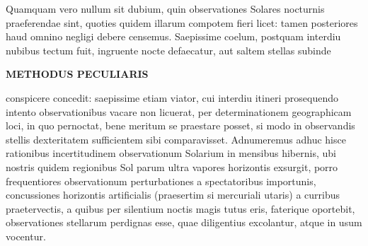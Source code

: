 Quamquam vero nullum sit dubium, quin observationes Solares nocturnis praeferendae sint, quoties quidem illarum compotem fieri licet: tamen posteriores haud omnino negligi debere censemus. Saepissime coelum, postquam interdiu nubibus tectum fuit, ingruente nocte defaecatur, aut saltem stellas subinde
\par\clearpage
\noindent{}%
%
\parbox[t]{\dimexpr\linewidth-24mm\relax}{\centering\fontsize{7.4}{9.2}\selectfont\bfseries METHODUS PECULIARIS\par}%
\makebox[12mm][r]{}\par\nobreak\smallskip
\noindent conspicere concedit: saepissime etiam viator, cui interdiu itineri prosequendo intento observationibus vacare non licuerat, per determinationem geographicam loci, in quo pernoctat, bene meritum se praestare posset, si modo in observandis stellis dexteritatem sufficientem sibi comparavisset. Adnumeremus adhuc hisce rationibus incertitudinem observationum Solarium in mensibus hibernis, ubi nostris quidem regionibus Sol parum ultra vapores horizontis exsurgit, porro frequentiores observationum perturbationes a spectatoribus importunis, concussiones horizontis artificialis (praesertim si mercuriali utaris) a curribus praetervectis, a quibus per silentium noctis magis tutus eris, faterique oportebit, observationes stellarum perdignas esse, quae diligentius excolantur, atque in usum vocentur.

